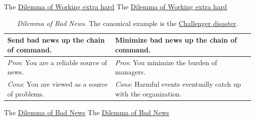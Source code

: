 The \href{table:work_extra_or_work_as_expected}{Dilemma of Working extra hard}
The \href{table:work_extra_or_work_as_expected}{Dilemma of Working extra hard}


\begin{center}
\begin{table}[H] %
\begin{tabular}{ | m{\dilemmatablewidth}| m{\dilemmatablewidth} | } 
  \hline
  \textbf{Send bad news up the chain of command.} &
  \textbf{Minimize bad news up the chain of command.} \\
  \hline
  \textit{Pros}: You are a reliable source of news. &
  \textit{Pros}: You minimize the burden of managers. \\
  \hline
  \textit{Cons}: You are viewed as a source of problems. & 
  \textit{Cons}: Harmful events eventually catch up with the organization.  \\
  \hline
\end{tabular}
\caption{\textit{Dilemma of Bad News.}
The canonical example is the \href{https://en.wikipedia.org/wiki/Space_Shuttle_Challenger_disaster}{Challenger disaster}.}
\label{table:bad-news-up-the-chain}
\end{table}
\end{center}

The \href{table:bad-news-up-the-chain}{Dilemma of Bad News}
The \href{table:bad-news-up-the-chain}{Dilemma of Bad News}


